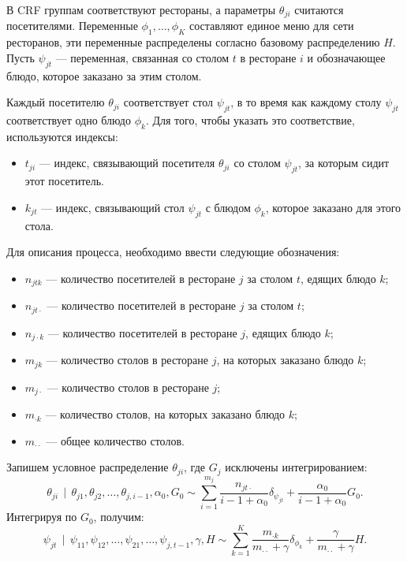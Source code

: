 \documentclass[12pt, a4paper]{article}
\DeclareMathOperator{\svert}{\,\vert\,}
\begin{document}
  В CRF группам соответствуют рестораны, а параметры $\theta_{ji}$ считаются посетителями. Переменные $\phi_1, \ldots, \phi_K$ составляют единое меню для сети ресторанов, эти переменные распределены согласно базовому распределению $H$. Пусть $\psi_{jt}$ --- переменная, связанная со столом $t$ в ресторане $i$ и обозначающее блюдо, которое заказано за этим столом.
  
  Каждый посетителю $\theta_{ji}$ соответствует стол $\psi_{jt}$, в то время как каждому столу $\psi_{jt}$ соответствует одно блюдо $\phi_k$. Для того, чтобы указать это соответствие, используются индексы:
  \begin{itemize}
  	\item $t_{ji}$ --- индекс, связывающий посетителя $\theta_{ji}$ со столом $\psi_{jt}$, за которым сидит этот посетитель.
  	\item $k_{jt}$ --- индекс, связывающий стол $\psi_{jt}$ с блюдом $\phi_k$, которое заказано для этого стола.
  \end{itemize}
  Для описания процесса, необходимо ввести следующие обозначения:
  \begin{itemize}
  \item $n_{jtk}$ --- количество посетителей в ресторане $j$ за столом $t$, едящих блюдо $k$;
  \item $n_{jt\cdot}$ --- количество посетителей в ресторане $j$ за столом $t$;
  \item $n_{j\cdot k}$ --- количество посетителей в ресторане $j$, едящих блюдо $k$;
  \item $m_{jk}$ --- количество столов в ресторане $j$, на которых заказано блюдо $k$;
  \item $m_{j\cdot}$ --- количество столов в ресторане $j$;
  \item $m_{\cdot k}$ --- количество столов, на которых заказано блюдо $k$;
  \item $m_{\cdot \cdot}$ --- общее количество столов.
  \end{itemize}
  
  Запишем условное распределение $\theta_{ji}$, где $G_j$ исключены интегрированием:
  \begin{equation}
  \label{eq:1}
  \theta_{ji} \svert \theta_{j1}, \theta_{j2}, \ldots, \theta_{j,i-1}, \alpha_0, G_0 \sim
  \sum \limits_{i=1}^{m_j} \frac{n_{j t \cdot}}{i - 1 + \alpha_0} \delta_{\psi_{jt}} + \frac{\alpha_0}{i - 1 + \alpha_0} G_0.
  \end{equation}
  Интегрируя по $G_0$, получим:
  \begin{equation}
  \label{eq:2}
  \psi_{jt} \svert \psi_{11}, \psi_{12}, \ldots, \psi_{21}, \ldots, \psi_{j, t-1}, \gamma, H \sim
  \sum \limits_{k=1}^{K} \frac{m_{\cdot k}}{m_{\cdot \cdot} + \gamma} \delta_{\phi_k} + \frac{\gamma}{m_{\cdot \cdot} + \gamma} H.
  \end{equation}
  
\end{document}
